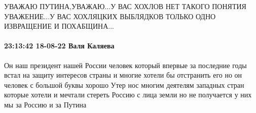 УВАЖАЮ ПУТИНА,УВАЖАЮ...У ВАС ХОХЛОВ НЕТ ТАКОГО ПОНЯТИЯ УВАЖЕНИЕ...У ВАС
ХОХЛЯЦКИХ ВЫБЛЯДКОВ ТОЛЬКО ОДНО ИЗВРАЩЕНИЕ И ПОХАБЩИНА...

\paragraph{23:13:42 18-08-22 Валя Каляева}

Он наш президент нашей России человек который впервые за последние годы встал
на защиту интересов страны и многие хотели бы отстранить его но он человек с
большой буквы хорошо Утер нос многим деятелям западных стран которые хотели и
мечтали стереть Россию с лица земли но не получается у них мы за Россию и за
Путина

